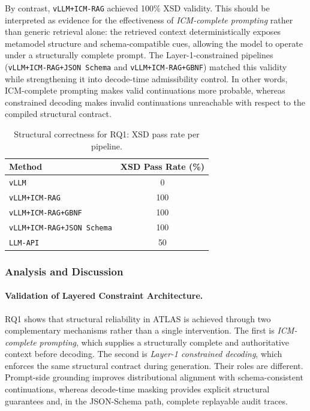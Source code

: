 \documentclass[acmlarge,nonacm]{acmart}
\theoremstyle{acmplain}
\theoremstyle{acmdefinition}
\begin{document}
By contrast, \texttt{vLLM+ICM-RAG} achieved 100\% XSD validity. This should be interpreted as evidence for the effectiveness of \emph{ICM-complete prompting} rather than generic retrieval alone: the retrieved context deterministically exposes metamodel structure and schema-compatible cues, allowing the model to operate under a structurally complete prompt. The Layer-1-constrained pipelines (\texttt{vLLM+ICM-RAG+JSON Schema} and \texttt{vLLM+ICM-RAG+GBNF}) matched this validity while strengthening it into decode-time admissibility control. In other words, ICM-complete prompting makes valid continuations more probable, whereas constrained decoding makes invalid continuations unreachable with respect to the compiled structural contract.

\begin{table}[!htbp]
  \centering
  \small
  \caption{Structural correctness for RQ1: XSD pass rate per pipeline.}
  \label{tab:rq1-correctness}
  \begin{tabular}{@{}lc@{}}
    \toprule
    \textbf{Method}                 & \textbf{XSD Pass Rate (\%)} \\
    \midrule
    \texttt{vLLM}                   & 0   \\
    \texttt{vLLM+ICM-RAG}               & 100 \\
    \texttt{vLLM+ICM-RAG+GBNF}          & 100 \\
    \texttt{vLLM+ICM-RAG+JSON Schema}   & 100 \\
    \texttt{LLM-API}                & 50  \\
    \bottomrule
  \end{tabular}
\end{table}


\subsubsection{Analysis and Discussion}
\label{sec:rq1-analysis}

\paragraph{Validation of Layered Constraint Architecture.}
RQ1 shows that structural reliability in ATLAS is achieved through two complementary mechanisms rather than a single intervention. The first is \emph{ICM-complete prompting}, which supplies a structurally complete and authoritative context before decoding. The second is \emph{Layer-1 constrained decoding}, which enforces the same structural contract during generation. Their roles are different. Prompt-side grounding improves distributional alignment with schema-consistent continuations, whereas decode-time masking provides explicit structural guarantees and, in the JSON-Schema path, complete replayable audit traces.
\end{document}
